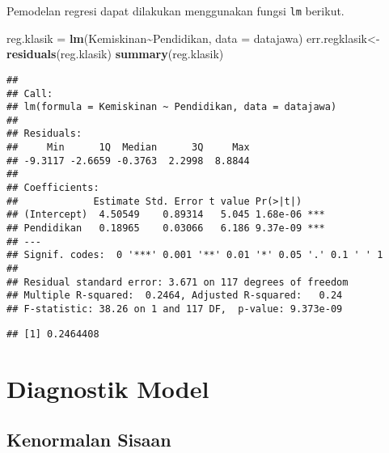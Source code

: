 \documentclass[
]{book}
\newenvironment{Shaded}{\begin{snugshade}}{\end{snugshade}}
\newcommand{\DataTypeTok}[1]{\textcolor[rgb]{0.13,0.29,0.53}{#1}}
\newcommand{\DecValTok}[1]{\textcolor[rgb]{0.00,0.00,0.81}{#1}}
\newcommand{\KeywordTok}[1]{\textcolor[rgb]{0.13,0.29,0.53}{\textbf{#1}}}
\newcommand{\NormalTok}[1]{#1}
\newcommand{\OperatorTok}[1]{\textcolor[rgb]{0.81,0.36,0.00}{\textbf{#1}}}
\newcommand{\StringTok}[1]{\textcolor[rgb]{0.31,0.60,0.02}{#1}}
\begin{document}
Pemodelan regresi dapat dilakukan menggunakan fungsi \texttt{lm} berikut.

\begin{Shaded}
\begin{Highlighting}[]
\NormalTok{reg.klasik =}\StringTok{ }\KeywordTok{lm}\NormalTok{(Kemiskinan}\OperatorTok{\textasciitilde{}}\NormalTok{Pendidikan, }\DataTypeTok{data =}\NormalTok{ datajawa)}
\NormalTok{err.regklasik\textless{}{-}}\KeywordTok{residuals}\NormalTok{(reg.klasik)}
\KeywordTok{summary}\NormalTok{(reg.klasik)}
\end{Highlighting}
\end{Shaded}

\begin{verbatim}
## 
## Call:
## lm(formula = Kemiskinan ~ Pendidikan, data = datajawa)
## 
## Residuals:
##     Min      1Q  Median      3Q     Max 
## -9.3117 -2.6659 -0.3763  2.2998  8.8844 
## 
## Coefficients:
##             Estimate Std. Error t value Pr(>|t|)    
## (Intercept)  4.50549    0.89314   5.045 1.68e-06 ***
## Pendidikan   0.18965    0.03066   6.186 9.37e-09 ***
## ---
## Signif. codes:  0 '***' 0.001 '**' 0.01 '*' 0.05 '.' 0.1 ' ' 1
## 
## Residual standard error: 3.671 on 117 degrees of freedom
## Multiple R-squared:  0.2464, Adjusted R-squared:   0.24 
## F-statistic: 38.26 on 1 and 117 DF,  p-value: 9.373e-09
\end{verbatim}

\begin{Shaded}
\end{Shaded}

\begin{verbatim}
## [1] 0.2464408
\end{verbatim}

\hypertarget{diagnostik-model}{%
\section{Diagnostik Model}\label{diagnostik-model}}

\hypertarget{kenormalan-sisaan}{%
\subsection{Kenormalan Sisaan}\label{kenormalan-sisaan}}
\end{document}
